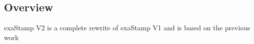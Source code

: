 \subsection{Overview}
\label{subsec:overview}

exaStamp V2 is a complete rewrite of exaStamp V1 and is based on the previous work \cite{Soulard2008}

